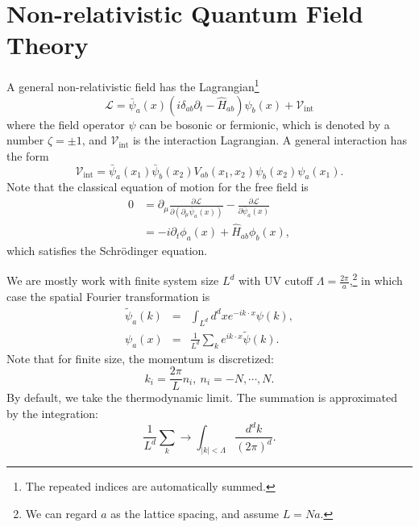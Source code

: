 \chapter{Non-relativistic Quantum Field Theory}
A general non-relativistic field has the Lagrangian\footnote{The repeated indices are automatically summed.}
\begin{equation}
	\mathcal L = \bar\psi_a(x) (i\delta_{ab}\partial_t-\hat H_{ab})\psi_b(x) + \mathcal{V}_{\mathrm{int}}
\end{equation}
where the field operator $\psi$ can be bosonic or fermionic, which is denoted by a number $\zeta=\pm 1$, and $\mathcal{V}_{\mathrm{int}}$ is the interaction Lagrangian.
A general interaction has the form
\begin{equation}
	\mathcal{V}_{\mathrm{int}} = \bar\psi_{a}(x_1)\bar\psi_{b}(x_2) V_{ab}(x_1,x_2) \psi_{b}(x_2)\psi_{a}(x_1).
\end{equation}
Note that the classical equation of motion for the free field is
\begin{equation}
\begin{aligned}
	0 &= \partial_\mu \frac{\partial \mathcal L}{\partial(\partial_\mu \bar\psi_a(x))} - \frac{\partial \mathcal L}{\partial\bar{\psi}_a(x)} \\
	&= - i\partial_t \phi_a(x) + \hat H_{ab}\phi_b(x),
\end{aligned}
\end{equation}
which satisfies the Schr\"{o}dinger equation.

We are mostly work with finite system size $L^d$ with UV cutoff $\Lambda = \frac{2\pi}{a}$,\footnote{We can regard $a$ as the lattice spacing, and assume $L = Na$.} in which case the spatial Fourier transformation is
\begin{eqnarray}
	\tilde{\psi}_a(k) &=& \int_{L^d} d^dx e^{-i k \cdot x}\psi(k), \\
	\psi_a(x) &=& \frac{1}{L^d}\sum_{k} e^{i k \cdot x}\tilde{\psi}(k).
\end{eqnarray}
Note that for finite size, the momentum is discretized: 
\begin{equation}
	k_i = \frac{2\pi}{L} n_i,\ n_i = -N,\cdots,N.
\end{equation}
By default, we take the thermodynamic limit.
The summation is approximated by the integration:
\begin{equation}
	\frac{1}{L^d}\sum_k \longrightarrow \int_{|k|<\Lambda} \frac{d^dk}{(2\pi)^d}.
\end{equation}

